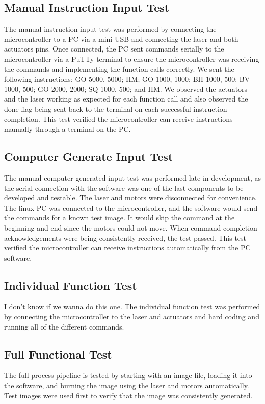 \documentclass[11pt]{LaTeX-Classes/math-hw}
\begin{document}
\subsection{Manual Instruction Input Test}
The manual instruction input test was performed by connecting the microcontroller to a PC via a mini USB and connecting the laser and both actuators pins. Once connected, the PC sent commands serially to the microcontroller via a PuTTy terminal to ensure the microcontroller was receiving the commands and implementing the function calls correctly. We sent the following instructions: GO 5000, 5000; HM; GO 1000, 1000; BH 1000, 500; BV 1000, 500; GO 2000, 2000; SQ 1000, 500; and HM. We observed the actuators and the laser working as expected for each function call and also observed the done flag being sent back to the terminal on each successful instruction completion. This test verified the microcontroller can receive instructions manually through a terminal on the PC.

\subsection{Computer Generate Input Test}
The manual computer generated input test was performed late in development, as the serial connection
with the software was one of the last components to be developed and testable.
The laser and motors were disconnected for convenience.
The linux PC was connected to the microcontroller, and the software would send the commands for
a known test image. It would skip the  command at the beginning and end since the motors
could not move.
When command completion acknowledgements were being consistently received, the test passed.
This test verified the microcontroller can receive instructions automatically from the PC software.

\subsection{Individual Function Test} I don't know if we wanna do this one.
The individual function test was performed by connecting the microcontroller to the laser and actuators and hard coding and running all of the different commands.  

\subsection{Full Functional Test}
The full process pipeline is tested by starting with an image file, loading it into the software,
and burning the image using the laser and motors automatically.
Test images were used first to verify that the image was consistently generated.
\end{document}
